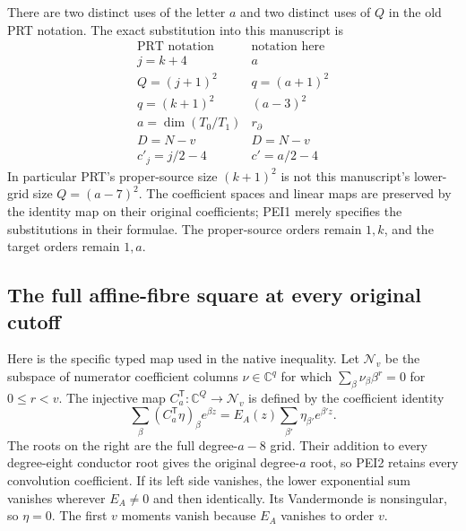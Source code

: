\documentclass[11pt,a4paper]{article}
\begin{document}
There are two distinct uses of the letter $a$ and two distinct uses of
$Q$ in the old PRT notation. The exact substitution into this manuscript is
\[
 \begin{array}{c|c}
 \text{PRT notation}&\text{notation here}\\ \hline
 j=k+4&a\\
 Q=(j+1)^2&q=(a+1)^2\\
 q=(k+1)^2&(a-3)^2\\
 a=\dim(T_0/T_1)&r_\partial\\
 D=N-v&D=N-v\\
 c'_j=j/2-4&c'=a/2-4
 \end{array}                                                     \tag{PEI1}
\]
In particular PRT's proper-source size $(k+1)^2$ is not this
manuscript's lower-grid size $Q=(a-7)^2$. The coefficient spaces and
linear maps are preserved by the identity map on their original
coefficients; PEI1 merely specifies the substitutions in their formulae.
The proper-source orders remain $1,k$, and the target orders remain $1,a$.

\subsection{The full affine-fibre square at every original cutoff}

Here is the specific typed map used in the native inequality.
Let $\mathscr N_v$ be the subspace of numerator coefficient columns
$\nu\in\mathbb C^q$ for which
$\sum_\beta\nu_\beta\beta^r=0$ for $0\le r<v$.
The injective map $C_a^{\mathsf T}:\mathbb C^Q\to\mathscr N_v$
is defined by the coefficient identity
\[
 \sum_\beta(C_a^{\mathsf T}\eta)_\beta e^{\beta z}
   =E_A(z)\sum_{\beta'}\eta_{\beta'}e^{\beta' z}.
                                                               \tag{PEI2}
\]
The roots on the right are the full degree-$a-8$ grid. Their addition
to every degree-eight conductor root gives the original degree-$a$
root, so PEI2 retains every convolution coefficient. If its left side
vanishes, the lower exponential sum vanishes wherever $E_A\ne0$ and
then identically. Its Vandermonde is nonsingular, so $\eta=0$.
The first $v$ moments vanish because $E_A$ vanishes to order $v$.
\end{document}
